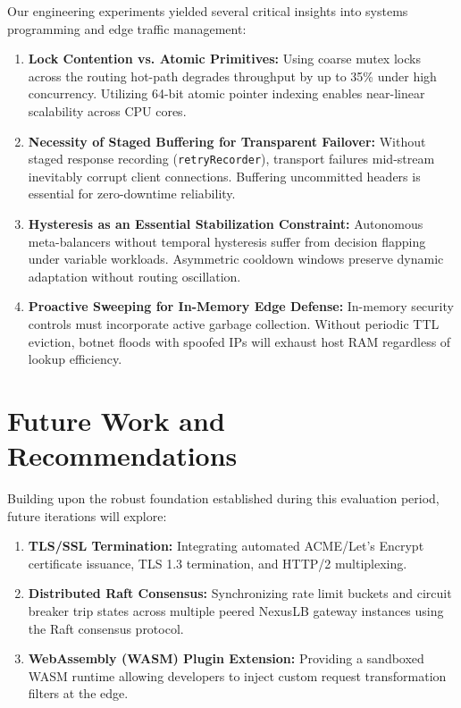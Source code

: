 \documentclass[12pt,openany]{report}
\begin{document}
Our engineering experiments yielded several critical insights into systems programming and edge traffic management:
\begin{enumerate}
  \item \textbf{Lock Contention vs. Atomic Primitives:} Using coarse mutex locks across the routing hot-path degrades throughput by up to 35\% under high concurrency. Utilizing 64-bit atomic pointer indexing enables near-linear scalability across CPU cores.
  \item \textbf{Necessity of Staged Buffering for Transparent Failover:} Without staged response recording (\texttt{retryRecorder}), transport failures mid-stream inevitably corrupt client connections. Buffering uncommitted headers is essential for zero-downtime reliability.
  \item \textbf{Hysteresis as an Essential Stabilization Constraint:} Autonomous meta-balancers without temporal hysteresis suffer from decision flapping under variable workloads. Asymmetric cooldown windows preserve dynamic adaptation without routing oscillation.
  \item \textbf{Proactive Sweeping for In-Memory Edge Defense:} In-memory security controls must incorporate active garbage collection. Without periodic TTL eviction, botnet floods with spoofed IPs will exhaust host RAM regardless of lookup efficiency.
\end{enumerate}

\section{Future Work and Recommendations}

Building upon the robust foundation established during this evaluation period, future iterations will explore:
\begin{enumerate}
  \item \textbf{TLS/SSL Termination:} Integrating automated ACME/Let's Encrypt certificate issuance, TLS 1.3 termination, and HTTP/2 multiplexing.
  \item \textbf{Distributed Raft Consensus:} Synchronizing rate limit buckets and circuit breaker trip states across multiple peered NexusLB gateway instances using the Raft consensus protocol.
  \item \textbf{WebAssembly (WASM) Plugin Extension:} Providing a sandboxed WASM runtime allowing developers to inject custom request transformation filters at the edge.
\end{enumerate}
\end{document}
